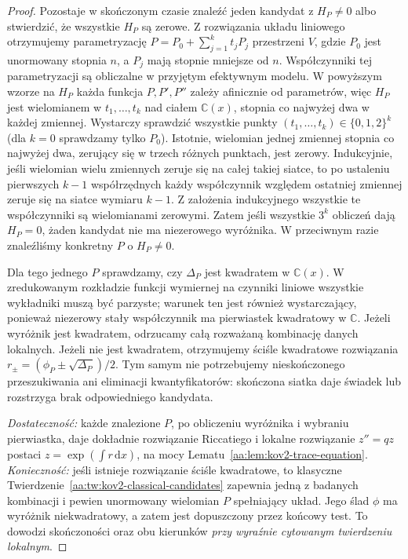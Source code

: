 \begin{proof}
Pozostaje w skończonym czasie znaleźć jeden
kandydat z $H_P\ne0$ albo stwierdzić,
że wszystkie $H_P$ są zerowe.
Z rozwiązania układu liniowego otrzymujemy
parametryzację
$P=P_0+\sum_{j=1}^k t_j P_j$
przestrzeni $V$, gdzie $P_0$ jest unormowany
stopnia $n$, a $P_j$ mają stopnie mniejsze od $n$.
Współczynniki tej parametryzacji są obliczalne
w przyjętym efektywnym modelu.
W powyższym wzorze na $H_P$ każda funkcja
$P,P',P''$ zależy afinicznie od parametrów,
więc $H_P$ jest wielomianem w $t_1,\ldots,t_k$
nad ciałem $\mathbb C(x)$, stopnia co najwyżej
dwa w każdej zmiennej.
Wystarczy sprawdzić wszystkie punkty
$(t_1,\ldots,t_k)\in\{0,1,2\}^k$
(dla $k=0$ sprawdzamy tylko $P_0$).
Istotnie, wielomian jednej zmiennej stopnia
co najwyżej dwa, zerujący się w trzech różnych
punktach, jest zerowy.
Indukcyjnie, jeśli wielomian wielu zmiennych
zeruje się na całej takiej siatce,
to po ustaleniu pierwszych $k-1$ współrzędnych
każdy współczynnik względem ostatniej zmiennej
zeruje się na siatce wymiaru $k-1$.
Z założenia indukcyjnego wszystkie te
współczynniki są wielomianami zerowymi.
Zatem jeśli wszystkie $3^k$ obliczeń dają
$H_P=0$, żaden kandydat nie ma niezerowego
wyróżnika. W przeciwnym razie znaleźliśmy
konkretny $P$ o $H_P\ne0$.

Dla tego jednego $P$ sprawdzamy, czy
$\Delta_P$ jest kwadratem w $\mathbb C(x)$.
W zredukowanym rozkładzie funkcji wymiernej
na czynniki liniowe wszystkie wykładniki
muszą być parzyste; warunek ten jest
również wystarczający, ponieważ niezerowy
stały współczynnik ma pierwiastek kwadratowy
w $\mathbb C$.
Jeżeli wyróżnik jest kwadratem, odrzucamy
całą rozważaną kombinację danych lokalnych.
Jeżeli nie jest kwadratem, otrzymujemy
ściśle kwadratowe rozwiązania
$r_\pm=(\phi_P\pm\sqrt{\Delta_P})/2$.
Tym samym nie potrzebujemy nieskończonego
przeszukiwania ani eliminacji kwantyfikatorów:
skończona siatka daje świadek lub rozstrzyga
brak odpowiedniego kandydata.

\emph{Dostateczność:}
każde znalezione $P$,
po obliczeniu wyróżnika
i wybraniu pierwiastka,
daje dokładnie rozwiązanie
Riccatiego i lokalne
rozwiązanie $z''=qz$
postaci
$z=\exp(\int r\,\mathrm dx)$,
na mocy
Lematu~\ref{aa:lem:kov2-trace-equation}.
\emph{Konieczność:}
jeśli istnieje rozwiązanie
ściśle kwadratowe,
to klasyczne
Twierdzenie~\ref{aa:tw:kov2-classical-candidates}
zapewnia jedną z
badanych kombinacji
i pewien unormowany
wielomian $P$
spełniający układ.
Jego ślad $\phi$
ma wyróżnik niekwadratowy,
a zatem jest dopuszczony
przez końcowy test.
To dowodzi skończoności
oraz obu kierunków
\emph{przy wyraźnie
cytowanym twierdzeniu lokalnym}.
\end{proof}


